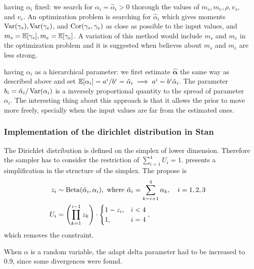 \begin{alineas}
  \item having $\alpha_i$ fixed: we search for $\alpha_i = \hat{\alpha}_i >
    0$ thorough the values of $m_s, m_e, \rho, v_s$, and $v_e$. An optimization
  problem is searching for $\hat{\alpha}_i$ which gives moments
  $\operatorname{Var}(\gamma_s), \operatorname{Var}(\gamma_e)$, and $\operatorname{Cor}(\gamma_s, \gamma_e)$ as close as
  possible to the input values, and $m_s = \mathbb{E}[\gamma_s], m_e =
    \mathbb{E}[\gamma_e]$. A variation of this method would include $m_s$ and $m_e$ in
  the optimization problem and it is suggested when believes about $m_s$ and
  $m_e$ are less strong.
  \item having $\alpha_i$ as a hierarchical parameter: we first estimate
  $\hat{\boldsymbol{\alpha}}$ the same way as described above and set
  $\mathbb{E}[\alpha_i] = a^i/b^i = \hat{\alpha}_i \implies a^i = b^i\hat{\alpha}_i$.
  The parameter $b_i = \hat{\alpha}_i/\operatorname{Var}(\alpha_i)$ is a inversely
  proportional quantity to the spread of parameter $\alpha_i$. The interesting
  thing about this approach is that it allows the prior to move more freely,
  specially when the input values are far from the estimated ones.
\end{alineas}

\subsubsection*{Implementation of the dirichlet distribution in Stan}

The Dirichlet distribution is defined on the simplex of lower dimension.
Therefore the sampler has to consider the restriction of $\sum_{i=1}^4 U_i =
  1$. \textcite{betancourt2012cruising} presents a simplification in the
structure of the simplex. The propose is \cite[p. 2]{betancourt2012cruising}
\begin{equation*}
  \begin{aligned}
    z_i & \sim \operatorname{Beta}(\tilde{\alpha}_i, \alpha_i), \text{ where } \tilde{\alpha}_i = \sum_{k=i+1}^4 \alpha_k, \quad i = 1,2,3 \\
    U_i & = \left(\prod_{k=1}^{i-1} z_k\right)\cdot \begin{cases}
      1 - z_i, & i < 4 \\
      1,       & i = 4
    \end{cases},
  \end{aligned}
\end{equation*}
which removes the constraint.

\begin{remark}
  When $\alpha$ is a random variable, the adapt delta parameter had to be
  increased to 0.9, since some divergences were found.
\end{remark}

